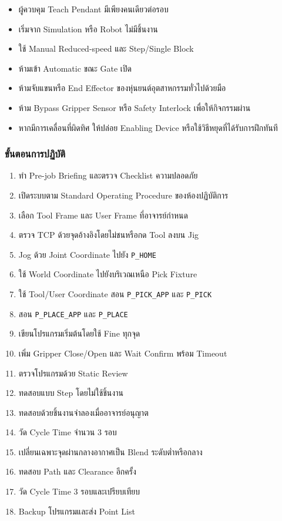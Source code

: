 \begin{itemize}
    \item ผู้ควบคุม Teach Pendant มีเพียงคนเดียวต่อรอบ
    \item เริ่มจาก Simulation หรือ Robot ไม่มีชิ้นงาน
    \item ใช้ Manual Reduced-speed และ Step/Single Block
    \item ห้ามเข้า Automatic ขณะ Gate เปิด
    \item ห้ามจับแขนหรือ End Effector ของหุ่นยนต์อุตสาหกรรมทั่วไปด้วยมือ
    \item ห้าม Bypass Gripper Sensor หรือ Safety Interlock เพื่อให้กิจกรรมผ่าน
    \item หากมีการเคลื่อนที่ผิดทิศ ให้ปล่อย Enabling Device หรือใช้วิธีหยุดที่ได้รับการฝึกทันที
\end{itemize}

\subsubsection{ขั้นตอนการปฏิบัติ}

\begin{enumerate}
    \item ทำ Pre-job Briefing และตรวจ Checklist ความปลอดภัย
    \item เปิดระบบตาม Standard Operating Procedure ของห้องปฏิบัติการ
    \item เลือก Tool Frame และ User Frame ที่อาจารย์กำหนด
    \item ตรวจ TCP ด้วยจุดอ้างอิงโดยไม่ชนหรือกด Tool ลงบน Jig
    \item Jog ด้วย Joint Coordinate ไปยัง \texttt{P\_HOME}
    \item ใช้ World Coordinate ไปยังบริเวณเหนือ Pick Fixture
    \item ใช้ Tool/User Coordinate สอน \texttt{P\_PICK\_APP} และ \texttt{P\_PICK}
    \item สอน \texttt{P\_PLACE\_APP} และ \texttt{P\_PLACE}
    \item เขียนโปรแกรมเริ่มต้นโดยใช้ Fine ทุกจุด
    \item เพิ่ม Gripper Close/Open และ Wait Confirm พร้อม Timeout
    \item ตรวจโปรแกรมด้วย Static Review
    \item ทดสอบแบบ Step โดยไม่ใช้ชิ้นงาน
    \item ทดสอบด้วยชิ้นงานจำลองเมื่ออาจารย์อนุญาต
    \item วัด Cycle Time จำนวน 3 รอบ
    \item เปลี่ยนเฉพาะจุดผ่านกลางอากาศเป็น Blend ระดับต่ำหรือกลาง
    \item ทดสอบ Path และ Clearance อีกครั้ง
    \item วัด Cycle Time 3 รอบและเปรียบเทียบ
    \item Backup โปรแกรมและส่ง Point List
\end{enumerate}


